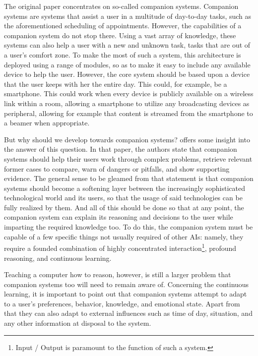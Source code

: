 \documentclass[a4paper]{article}
\begin{document}
The original paper concentrates on so-called companion systems. Companion systems are systems that assist a user in a multitude of day-to-day tasks, such as the aforementioned scheduling of appointments. However, the capabilities of a companion system do not stop there. Using a vast array of knowledge, these systems can also help a user with a new and unknown task, tasks that are out of a user's comfort zone. To make the most of such a system, this architecture is deployed using a range of modules, so as to make it easy to include any available device to help the user. However, the core system should be based upon a device that the user keeps with her the entire day. This could, for example, be a smartphone. This could work when every device is publicly available on a wireless link within a room, allowing a smartphone to utilize any broadcasting devices as peripheral, allowing for example that content is streamed from the smartphone to a beamer when appropriate.

But why should we develop towards companion systems? \cite{forbus2006companion} offers some insight into the answer of this question. In that paper, the authors state that companion systems should help their users work through complex problems, retrieve relevant former cases to compare, warn of dangers or pitfalls, and show supporting evidence. The general sense to be gleamed from that statement is that companion systems should become a softening layer between the increasingly sophisticated technological world and its users, so that the usage of said technologies can be fully realized by them. And all of this should be done so that at any point, the companion system can explain its reasoning and decisions to the user while imparting the required knowledge too. To do this, the companion system must be capable of a few specific things not usually required of other AIs: namely, they require a founded combination of highly concentrated interaction\footnote{Input / Output is paramount to the function of such a system.}, profound reasoning, and continuous learning.

Teaching a computer how to reason, however, is still a larger problem that companion systems too will need to remain aware of. Concerning the continuous learning, it is important to point out that companion systems attempt to adapt to a user's preferences, behavior, knowledge, and emotional state. Apart from that they can also adapt to external influences such as time of day, situation, and any other information at disposal to the system.
\end{document}
